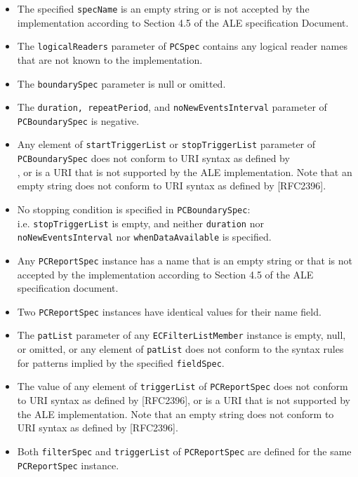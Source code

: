 \documentclass[11pt,a4paper,oneside]{article}
\begin{document}
\begin{itemize}
\item	The specified \texttt{specName} is an empty string or is not accepted by the implementation according to Section 4.5 of the ALE specification Document.
\item	The \texttt{logicalReaders} parameter of \texttt{PCSpec} contains any logical reader names that are not known to the implementation.
\item	The \texttt{boundarySpec} parameter is null or omitted.
\item	The \texttt{duration, repeatPeriod}, and \texttt{noNewEventsInterval} parameter of \texttt{PCBoundarySpec} is negative.
\item	Any element of \texttt{startTriggerList} or \texttt{stopTriggerList} parameter of \ifpdf\\\fi\texttt{PCBoundarySpec} does not conform to URI syntax as defined by  \ifpdf\\\fi[RFC2396], or is a URI that is not supported by the ALE implementation. Note that an empty string does not conform to URI syntax as defined by [RFC2396].
\item	No stopping condition is specified in \texttt{PCBoundarySpec}:\ifpdf\\\fi i.e. \texttt{stopTriggerList} is empty, and neither \texttt{duration} nor \ifpdf\\\fi\texttt{noNewEventsInterval} nor \texttt{whenDataAvailable} is specified.
\item	Any \texttt{PCReportSpec} instance has a name that is an empty string or that is not accepted by the implementation according to Section 4.5 of the ALE specification document.
\item	Two \texttt{PCReportSpec} instances have identical values for their name field.
\item	The \texttt{patList} parameter of any \texttt{ECFilterListMember} instance is empty, null, or omitted, or any element of \texttt{patList} does not conform to the syntax rules for patterns implied by the specified \texttt{fieldSpec}.
\item	The value of any element of \texttt{triggerList} of \texttt{PCReportSpec} does not conform to URI syntax as defined by [RFC2396], or is a URI that is not supported by the ALE implementation. Note that an empty string does not conform to URI syntax as defined by [RFC2396].
\item	Both \texttt{filterSpec} and \texttt{triggerList} of \texttt{PCReportSpec} are defined for the same \texttt{PCReportSpec} instance.

\end{itemize}
\end{document}

